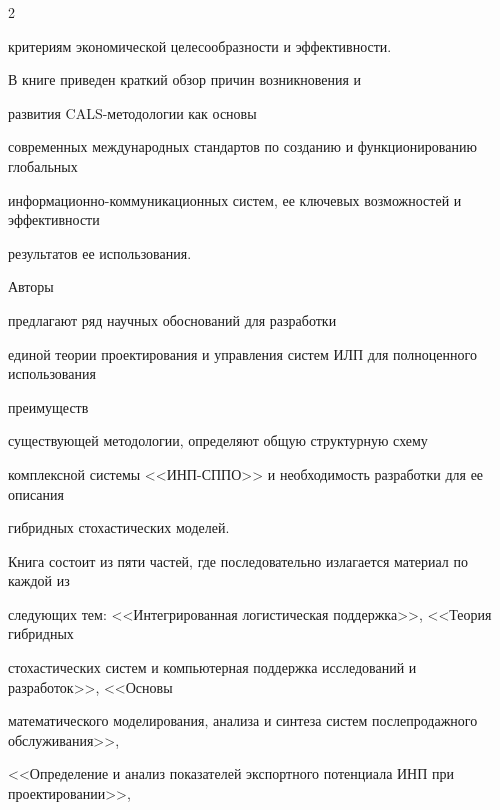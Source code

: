 \begin{multicols}{2}
{{критериям экономической целесообразности и эф\-фек\-тив\-ности.


  {





}


    


      В книге приведен краткий обзор причин возник\-новения и


      развития CALS-методологии как основы 


современных международных стандартов по созданию и функционированию глобальных 


ин\-фор\-ма\-ци\-он\-но-ком\-му\-ни\-ка\-ци\-он\-ных систем, ее ключевых возможностей и эффективности 


результатов ее использования. 


Авторы %


предлагают ряд научных обоснований для разработки 


единой теории проектирования и управления систем ИЛП для полноценного использования 


преимуществ %


 суще\-ст\-ву\-ющей методологии, определяют \mbox{общую} структурную схему 


комплексной системы <<ИНП-СППО>> и необходимость разработки для ее описания 


гибридных стохастических моделей.


{%





}







      


      Книга состоит из пяти частей, где последовательно излагается материал по каждой из 


следующих тем: <<Интегрированная логистическая поддержка>>, <<Теория гибридных 


стохастических систем и компьютерная поддержка исследований и разработок>>, <<Основы 


математического моделирования, анализа и синтеза систем послепродажного обслуживания>>, 


<<Определение и анализ показателей экспортного потенциала ИНП при проектировании>>, 


}}
\end{multicols}

